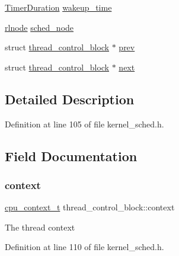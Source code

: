 \begin{DoxyCompactItemize}
\item 
\hyperlink{bios_8h_ae7291e5cd742fb9bc6d4aaa0d51bd0ee}{Timer\+Duration} \hyperlink{structthread__control__block_a7dbf9ba7df67911abb7951e249f587b6}{wakeup\+\_\+time}
\item 
\hyperlink{group__rlists_ga8f6244877f7ce2322c90525217ea6e7a}{rlnode} \hyperlink{structthread__control__block_add433b079e04053fe70fdd2b92e1d6ad}{sched\+\_\+node}
\item 
struct \hyperlink{structthread__control__block}{thread\+\_\+control\+\_\+block} $\ast$ \hyperlink{structthread__control__block_a605a6e9bb8154b658ee72e193599d180}{prev}
\item 
struct \hyperlink{structthread__control__block}{thread\+\_\+control\+\_\+block} $\ast$ \hyperlink{structthread__control__block_ac6b51ca735291f730ca1d4c335fb9359}{next}
\end{DoxyCompactItemize}


\subsection{Detailed Description}


Definition at line 105 of file kernel\+\_\+sched.\+h.



\subsection{Field Documentation}
\mbox{\label{structthread__control__block_a9c107039dffa851dde6edabd6cd3f89c}} 
\subsubsection{\texorpdfstring{context}{context}}
{\footnotesize\ttfamily \hyperlink{bios_8h_a6067c1395a75fc3e17f1ea6353065b54}{cpu\+\_\+context\+\_\+t} thread\+\_\+control\+\_\+block\+::context}

The thread context 

Definition at line 110 of file kernel\+\_\+sched.\+h.

\mbox{\label{structthread__control__block_ac6b51ca735291f730ca1d4c335fb9359}} 

